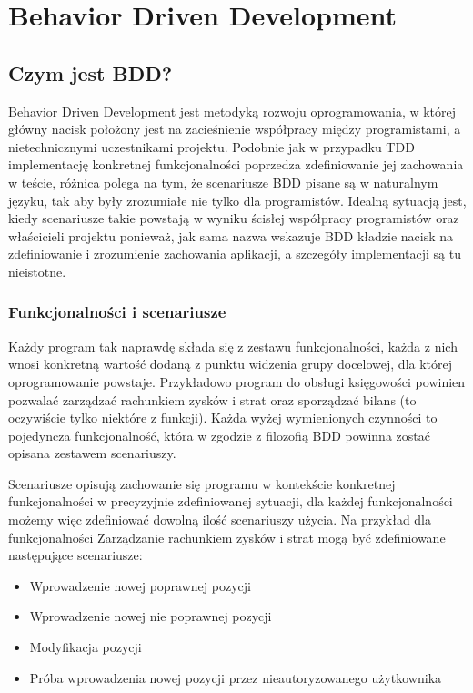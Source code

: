 \chapter[Behavior Driven Development]{Behavior Driven Development}
  \section{Czym jest BDD?}
    Behavior Driven Development jest metodyką rozwoju oprogramowania, w której główny nacisk położony jest na zacieśnienie współpracy między programistami, a nietechnicznymi uczestnikami projektu. Podobnie jak w przypadku TDD implementację konkretnej funkcjonalności poprzedza zdefiniowanie jej zachowania w teście, różnica polega na tym, że scenariusze BDD pisane są w naturalnym języku, tak aby były zrozumiałe nie tylko dla programistów. Idealną sytuacją jest, kiedy scenariusze takie powstają w wyniku ścisłej współpracy programistów oraz właścicieli projektu ponieważ, jak sama nazwa wskazuje BDD kładzie nacisk na zdefiniowanie i zrozumienie zachowania aplikacji, a szczegóły implementacji są tu nieistotne.
    \subsection{Funkcjonalności i scenariusze}
      Każdy program tak naprawdę składa się z zestawu funkcjonalności, każda z nich wnosi konkretną wartość dodaną z punktu widzenia grupy docelowej, dla której oprogramowanie powstaje. Przykładowo program do obsługi księgowości powinien pozwalać zarządzać rachunkiem zysków i strat oraz sporządzać bilans (to oczywiście tylko niektóre z funkcji). Każda wyżej wymienionych czynności to pojedyncza funkcjonalność, która w zgodzie z filozofią BDD powinna zostać opisana zestawem scenariuszy.
      
      Scenariusze opisują zachowanie się programu w kontekście konkretnej funkcjonalności w precyzyjnie zdefiniowanej sytuacji, dla każdej funkcjonalności możemy więc zdefiniować dowolną ilość scenariuszy użycia. Na przykład dla funkcjonalności Zarządzanie rachunkiem zysków i strat mogą być zdefiniowane następujące scenariusze:
      
      \begin{itemize}
        \item Wprowadzenie nowej poprawnej pozycji
        \item Wprowadzenie nowej nie poprawnej pozycji
        \item Modyfikacja pozycji
        \item Próba wprowadzenia nowej pozycji przez nieautoryzowanego użytkownika
      \end{itemize}
      
